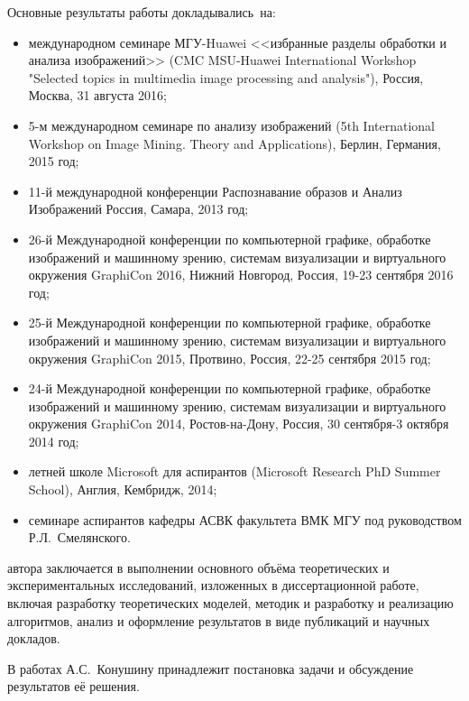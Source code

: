 {\probation}
Основные результаты работы докладывались~на:
\begin{itemize}
	\item международном семинаре МГУ-Huawei <<избранные разделы обработки и анализа изображений>> (CMC MSU-Huawei International Workshop "Selected topics in multimedia image processing and analysis"), Россия, Москва, 31 августа 2016;
	\item 5-м международном семинаре по анализу изображений (5th International Workshop on Image Mining. Theory and Applications), Берлин, Германия, 2015 год;
	\item 11-й международной конференции Распознавание образов и Анализ Изображений Россия, Самара, 2013 год;
	\item 26-й Международной конференции по компьютерной графике, обработке изображений и машинному зрению, системам визуализации и виртуального окружения GraphiCon 2016, Нижний Новгород, Россия, 19-23 сентября 2016 год;
	\item 25-й Международной конференции по компьютерной графике, обработке изображений и машинному зрению, системам визуализации и виртуального окружения GraphiCon 2015, Протвино, Россия, 22-25 сентября 2015 год;	
	\item 24-й Международной конференции по компьютерной графике, обработке изображений и машинному зрению, системам визуализации и виртуального окружения GraphiCon 2014, Ростов-на-Дону, Россия, 30 сентября-3 октября 2014 год;
	\item летней школе Microsoft для аспирантов (Microsoft Research PhD Summer School), Англия, Кембридж, 2014;
	\item семинаре аспирантов кафедры АСВК факультета ВМК МГУ под руководством Р.Л.~Смелянского.
\end{itemize}

{\contribution} автора заключается в выполнении основного объёма теоретических и экспериментальных исследований, изложенных в диссертационной работе, включая разработку теоретических моделей, методик и разработку и реализацию алгоритмов, анализ и оформление результатов в виде публикаций и научных докладов.

В работах \cite{konushin2017ispolzovanie48435059,konushin2015an-improvement33378280,konushin2015human9613323,konushin2013improvement5112417,gringauz2016estimation34131922,konushin2016further34136983,gringauz2014modification7624365} А.С.~Конушину принадлежит постановка задачи и обсуждение результатов её решения.


